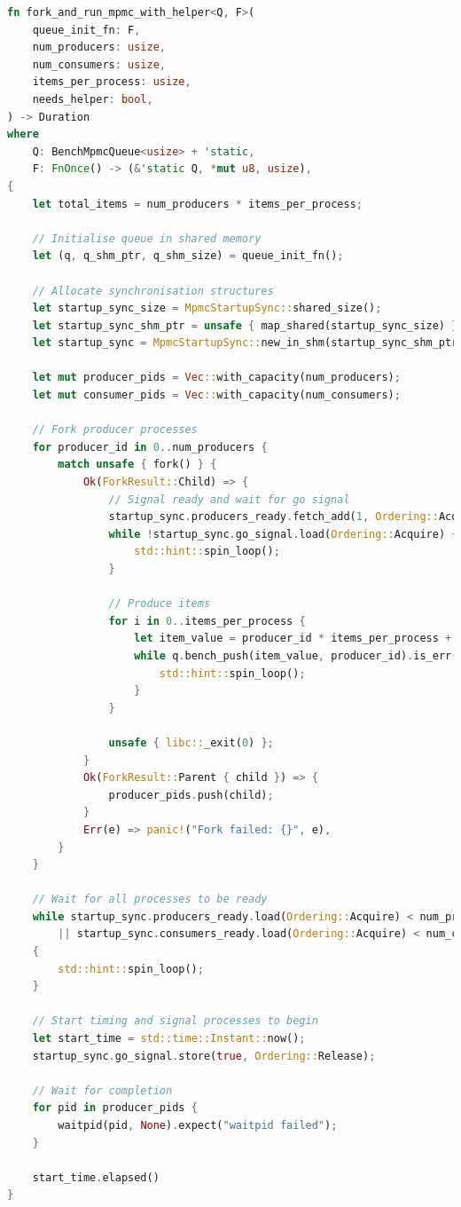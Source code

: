 \begin{lstlisting}[language=Rust, style=boxed, caption={Generic benchmark execution function}, label={lst:fork-and-run}]
fn fork_and_run_mpmc_with_helper<Q, F>(
    queue_init_fn: F,
    num_producers: usize,
    num_consumers: usize,
    items_per_process: usize,
    needs_helper: bool,
) -> Duration
where
    Q: BenchMpmcQueue<usize> + 'static,
    F: FnOnce() -> (&'static Q, *mut u8, usize),
{
    let total_items = num_producers * items_per_process;
    
    // Initialise queue in shared memory
    let (q, q_shm_ptr, q_shm_size) = queue_init_fn();
    
    // Allocate synchronisation structures
    let startup_sync_size = MpmcStartupSync::shared_size();
    let startup_sync_shm_ptr = unsafe { map_shared(startup_sync_size) };
    let startup_sync = MpmcStartupSync::new_in_shm(startup_sync_shm_ptr);
    
    let mut producer_pids = Vec::with_capacity(num_producers);
    let mut consumer_pids = Vec::with_capacity(num_consumers);
    
    // Fork producer processes
    for producer_id in 0..num_producers {
        match unsafe { fork() } {
            Ok(ForkResult::Child) => {
                // Signal ready and wait for go signal
                startup_sync.producers_ready.fetch_add(1, Ordering::AcqRel);
                while !startup_sync.go_signal.load(Ordering::Acquire) {
                    std::hint::spin_loop();
                }
                
                // Produce items
                for i in 0..items_per_process {
                    let item_value = producer_id * items_per_process + i;
                    while q.bench_push(item_value, producer_id).is_err() {
                        std::hint::spin_loop();
                    }
                }
                
                unsafe { libc::_exit(0) };
            }
            Ok(ForkResult::Parent { child }) => {
                producer_pids.push(child);
            }
            Err(e) => panic!("Fork failed: {}", e),
        }
    }
    
    // Wait for all processes to be ready
    while startup_sync.producers_ready.load(Ordering::Acquire) < num_producers as u32
        || startup_sync.consumers_ready.load(Ordering::Acquire) < num_consumers as u32
    {
        std::hint::spin_loop();
    }
    
    // Start timing and signal processes to begin
    let start_time = std::time::Instant::now();
    startup_sync.go_signal.store(true, Ordering::Release);
    
    // Wait for completion
    for pid in producer_pids {
        waitpid(pid, None).expect("waitpid failed");
    }
    
    start_time.elapsed()
}
\end{lstlisting}

